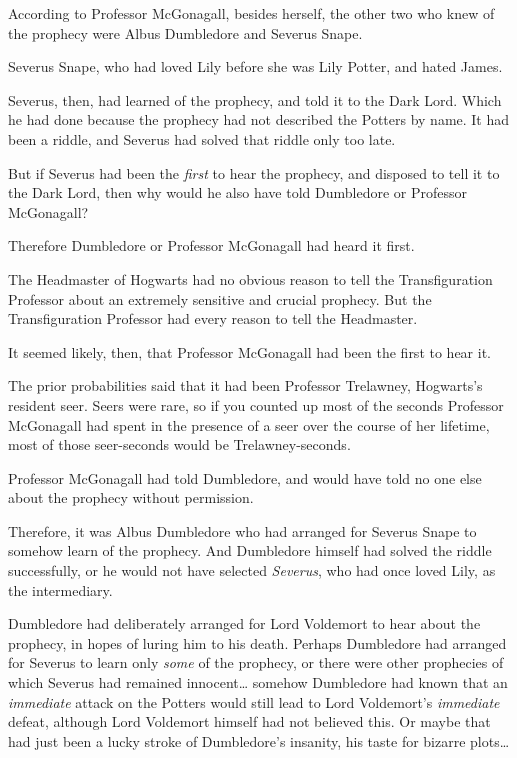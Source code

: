According to Professor McGonagall, besides herself, the other two who
knew of the prophecy were Albus Dumbledore and Severus Snape.

Severus Snape, who had loved Lily before she was Lily Potter, and hated
James.

Severus, then, had learned of the prophecy, and told it to the Dark
Lord. Which he had done because the prophecy had not described the
Potters by name. It had been a riddle, and Severus had solved that
riddle only too late.

But if Severus had been the \emph{first} to hear the prophecy, and
disposed to tell it to the Dark Lord, then why would he also have told
Dumbledore or Professor McGonagall?

Therefore Dumbledore or Professor McGonagall had heard it first.

The Headmaster of Hogwarts had no obvious reason to tell the
Transfiguration Professor about an extremely sensitive and crucial
prophecy. But the Transfiguration Professor had every reason to tell the
Headmaster.

It seemed likely, then, that Professor McGonagall had been the first to
hear it.

The prior probabilities said that it had been Professor Trelawney,
Hogwarts's resident seer. Seers were rare, so if you counted up most of
the seconds Professor McGonagall had spent in the presence of a seer
over the course of her lifetime, most of those seer-seconds would be
Trelawney-seconds.

Professor McGonagall had told Dumbledore, and would have told no one
else about the prophecy without permission.

Therefore, it was Albus Dumbledore who had arranged for Severus Snape to
somehow learn of the prophecy. And Dumbledore himself had solved the
riddle successfully, or he would not have selected \emph{Severus}, who
had once loved Lily, as the intermediary.

Dumbledore had deliberately arranged for Lord Voldemort to hear about
the prophecy, in hopes of luring him to his death. Perhaps Dumbledore
had arranged for Severus to learn only \emph{some} of the prophecy, or
there were other prophecies of which Severus had remained
innocent\ldots{} somehow Dumbledore had known that an \emph{immediate}
attack on the Potters would still lead to Lord Voldemort's
\emph{immediate} defeat, although Lord Voldemort himself had not
believed this. Or maybe that had just been a lucky stroke of
Dumbledore's insanity, his taste for bizarre plots\ldots{}

